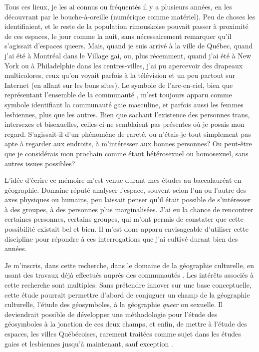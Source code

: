 Tous ces lieux, je les ai connus ou fréquentés il y a plusieurs années, en les découvrant par le bouche-à-oreille (numérique comme matériel).
Peu de choses les identifiaient, et le reste de la population rimouskoise pouvait passer à proximité de ces espaces, le jour comme la nuit, sans nécessairement remarquer qu'il s'agissait d'espaces queers.
Mais, quand je suis arrivé à la ville de Québec, quand j'ai été à Montréal dans le Village gai, ou, plus récemment, quand j'ai été à New York ou à Philadelphie dans les centres-villes, j'ai pu apercevoir des drapeaux multicolores, ceux qu'on voyait parfois à la télévision et un peu partout sur Internet (en allant sur les bons sites).
Le symbole de l'arc-en-ciel, bien que représentant l'ensemble de la communauté \lgbt{}, m'est toujours apparu comme symbole identifiant la communauté gaie masculine, et parfois aussi les femmes lesbiennes, plus que les autres.
Bien que sachant l'existence des personnes trans, intersexes et bisexuelles, celles-ci ne semblaient pas présentes où je posais mon regard.
S'agissait-il d'un phénomène de rareté, ou n’étais-je tout simplement pas apte à regarder aux endroits, à m'intéresser aux bonnes personnes?
Ou peut-être que je considérais mon prochain comme étant hétérosexuel ou homosexuel, sans autres issues possibles?

L'idée d'écrire ce mémoire m'est venue durant mes études au baccalauréat en géographie.
Domaine réputé analyser l'espace, souvent selon l'un ou l'autre des axes physiques ou humains, peu laissait penser qu'il était possible de s'intéresser à des groupes, à des personnes plus marginalisées.
J'ai eu la chance de rencontrer certaines personnes, certains groupes, qui m'ont permis de constater que cette possibilité existait bel et bien.
Il m'est donc apparu envisageable d'utiliser cette discipline pour répondre à ces interrogations que j'ai cultivé durant bien des années.

Je m'inscris, dans cette recherche, dans le domaine de la géographie culturelle, en usant des travaux déjà effectués auprès des communautés \lgbt{}.
Les intérêts associés à cette recherche sont multiples.
Sans prétendre innover sur une base conceptuelle, cette étude pourrait permettre d'abord de conjuguer un champ de la géographie culturelle, l'étude des géosymboles, à la géographie \emph{queer} ou sexuelle.
Il deviendrait possible de développer une méthodologie pour l'étude des géosymboles à la jonction de ces deux champs, et enfin, de mettre à l'étude des espaces, les villes Québécoises, rarement traitées comme sujet dans les études gaies et lesbiennes jusqu'à maintenant, sauf exception \parencite{Chamberland1993a,Podmore2006,Podmore2001,Hebert2012,Hunt2008,Laprade2014}.

